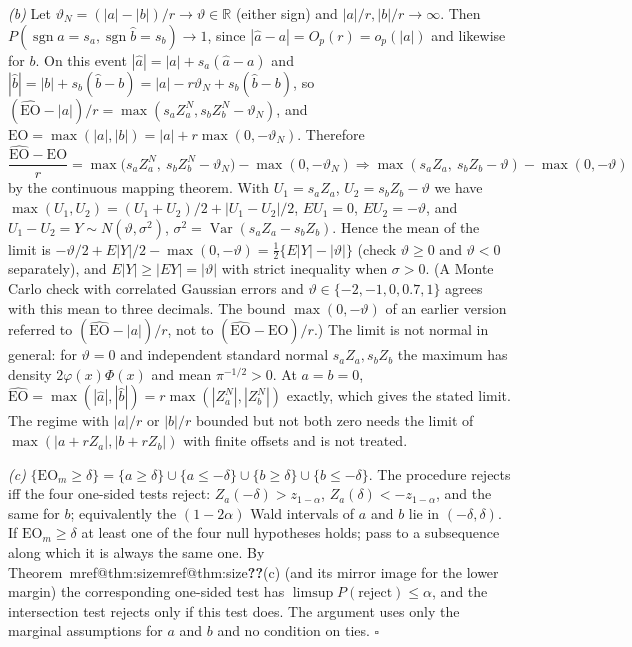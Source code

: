 \documentclass[pdflatex,sn-mathphys-num,iicol]{sn-jnl}
\makeatletter
\theoremstyle{thmstyleone}
\theoremstyle{thmstyletwo}
\theoremstyle{thmstylethree}
\newcommand{\Mref}[1]{\ifcsname mref@#1\endcsname\csname mref@#1\endcsname\else\textbf{??}\fi}
\makeatother
\begin{document}
\emph{(b)} Let $\vartheta_N=(|a|-|b|)/r\to\vartheta\in\mathbb R$ (either sign) and $|a|/r,|b|/r\to\infty$. Then $P(\operatorname{sgn}\hat a=s_a,\operatorname{sgn}\hat b=s_b)\to1$, since $|\hat a-a|=O_p(r)=o_p(|a|)$ and likewise for $b$. On this event $|\hat a|=|a|+s_a(\hat a-a)$ and $|\hat b|=|b|+s_b(\hat b-b)=|a|-r\vartheta_N+s_b(\hat b-b)$, so $(\widehat{\mathrm{EO}}-|a|)/r=\max(s_aZ_a^N,s_bZ_b^N-\vartheta_N)$, and $\mathrm{EO}=\max(|a|,|b|)=|a|+r\max(0,-\vartheta_N)$. Therefore
\[
\frac{\widehat{\mathrm{EO}}-\mathrm{EO}}{r}=\max\big(s_aZ_a^N,\ s_bZ_b^N-\vartheta_N\big)-\max(0,-\vartheta_N)\Rightarrow\max(s_aZ_a,\ s_bZ_b-\vartheta)-\max(0,-\vartheta)
\]
by the continuous mapping theorem. With $U_1=s_aZ_a$, $U_2=s_bZ_b-\vartheta$ we have $\max(U_1,U_2)=(U_1+U_2)/2+|U_1-U_2|/2$, $EU_1=0$, $EU_2=-\vartheta$, and $U_1-U_2=Y\sim N(\vartheta,\sigma^2)$, $\sigma^2=\operatorname{Var}(s_aZ_a-s_bZ_b)$. Hence the mean of the limit is $-\vartheta/2+E|Y|/2-\max(0,-\vartheta)=\tfrac12\{E|Y|-|\vartheta|\}$ (check $\vartheta\ge0$ and $\vartheta<0$ separately), and $E|Y|\ge|EY|=|\vartheta|$ with strict inequality when $\sigma>0$. (A Monte Carlo check with correlated Gaussian errors and $\vartheta\in\{-2,-1,0,0.7,1\}$ agrees with this mean to three decimals. The bound $\max(0,-\vartheta)$ of an earlier version referred to $(\widehat{\mathrm{EO}}-|a|)/r$, not to $(\widehat{\mathrm{EO}}-\mathrm{EO})/r$.) The limit is not normal in general: for $\vartheta=0$ and independent standard normal $s_aZ_a,s_bZ_b$ the maximum has density $2\varphi(x)\Phi(x)$ and mean $\pi^{-1/2}>0$. At $a=b=0$, $\widehat{\mathrm{EO}}=\max(|\hat a|,|\hat b|)=r\max(|Z_a^N|,|Z_b^N|)$ exactly, which gives the stated limit. The regime with $|a|/r$ or $|b|/r$ bounded but not both zero needs the limit of $\max(|a+rZ_a|,|b+rZ_b|)$ with finite offsets and is not treated.

\emph{(c)} $\{\mathrm{EO}_m\ge\delta\}=\{a\ge\delta\}\cup\{a\le-\delta\}\cup\{b\ge\delta\}\cup\{b\le-\delta\}$. The procedure rejects iff the four one-sided tests reject: $Z_a(-\delta)>z_{1-\alpha}$, $Z_a(\delta)<-z_{1-\alpha}$, and the same for $b$; equivalently the $(1-2\alpha)$ Wald intervals of $a$ and $b$ lie in $(-\delta,\delta)$. If $\mathrm{EO}_m\ge\delta$ at least one of the four null hypotheses holds; pass to a subsequence along which it is always the same one. By Theorem~\Mref{thm:size}(c) (and its mirror image for the lower margin) the corresponding one-sided test has $\limsup P(\text{reject})\le\alpha$, and the intersection test rejects only if this test does. The argument uses only the marginal assumptions for $a$ and $b$ and no condition on ties. $\square$
\end{document}
